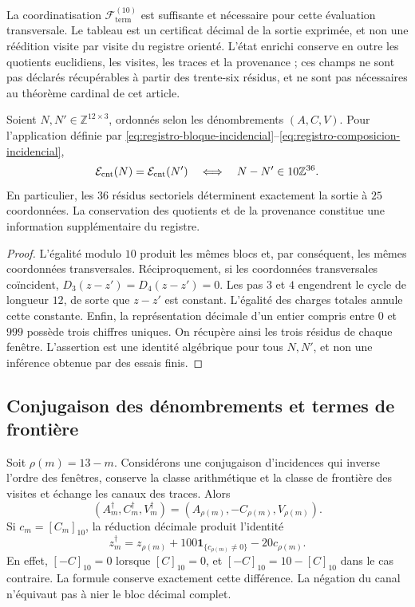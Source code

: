 La coordinatisation \(\mathscr F_{\mathrm{term}}^{(10)}\) est suffisante et nécessaire pour cette évaluation transversale. Le tableau est un certificat décimal de la sortie exprimée, et non une réédition visite par visite du registre orienté. L'état enrichi conserve en outre les quotients euclidiens, les visites, les traces et la provenance ; ces champs ne sont pas déclarés récupérables à partir des trente-six résidus, et ne sont pas nécessaires au théorème cardinal de cet article.

\begin{proposition}
\label{prop:registro-36-residuos}
Soient \(N,N'\in\mathbb Z^{12\times3}\), ordonnés selon les dénombrements
\((A,C,V)\). Pour l'application définie par
\eqref{eq:registro-bloque-incidencial}--\eqref{eq:registro-composicion-incidencial},
\[
 \mathcal E_{\rm cnt}(N)=\mathcal E_{\rm cnt}(N')
 \quad\Longleftrightarrow\quad
 N-N'\in10\mathbb Z^{36}.
\]
En particulier, les \(36\) résidus sectoriels déterminent exactement
la sortie à \(25\) coordonnées. La conservation des quotients et
de la provenance constitue une information supplémentaire du registre.
\end{proposition}

\begin{proof}
L'égalité modulo \(10\) produit les mêmes blocs et, par conséquent,
les mêmes coordonnées transversales. Réciproquement, si les coordonnées
transversales coïncident, \(D_3(z-z')=D_4(z-z')=0\). Les pas
\(3\) et \(4\) engendrent le cycle de longueur \(12\), de sorte que
\(z-z'\) est constant. L'égalité des charges totales annule cette
constante. Enfin, la représentation décimale d'un entier compris entre
\(0\) et \(999\) possède trois chiffres uniques. On récupère ainsi les
trois résidus de chaque fenêtre. L'assertion est une identité algébrique
pour tous \(N,N'\), et non une inférence obtenue par des essais finis.
\end{proof}

\subsection{Conjugaison des dénombrements et termes de frontière}
\label{subsec:registro-conjugacion-incidencial}

Soit \(\rho(m)=13-m\). Considérons une conjugaison d'incidences
qui inverse l'ordre des fenêtres, conserve la classe arithmétique et la
classe de frontière des visites et échange les canaux des traces.
Alors
\[
 (A_m^\dagger,C_m^\dagger,V_m^\dagger)
 =(A_{\rho(m)},-C_{\rho(m)},V_{\rho(m)}).
\]
Si \(c_m=[C_m]_{10}\), la réduction décimale produit l'identité
\begin{equation}
 z_m^\dagger=z_{\rho(m)}
       +100\mathbf1_{\{c_{\rho(m)}\ne0\}}-20c_{\rho(m)}.
 \label{eq:registro-conjugacion-decimal}
\end{equation}
En effet, \([-C]_{10}=0\) lorsque \([C]_{10}=0\), et
\([-C]_{10}=10-[C]_{10}\) dans le cas contraire. La formule conserve
exactement cette différence. La négation du canal n'équivaut pas à nier
le bloc décimal complet.

